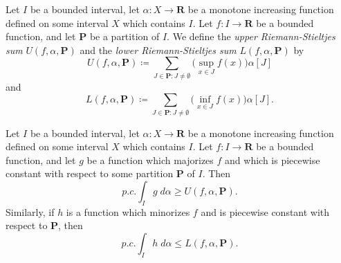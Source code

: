 \begin{additional corollary}\label{ac 11.8.12}
Let \(I\) be a bounded interval, let \(\alpha : X \to \mathbf{R}\) be a monotone increasing function defined on some interval \(X\) which contains \(I\).
Let \(f : I \to \mathbf{R}\) be a bounded function, and let \(\mathbf{P}\) be a partition of \(I\).
We define the \emph{upper Riemann-Stieltjes sum} \(U(f, \alpha, \mathbf{P})\) and the \emph{lower Riemann-Stieltjes sum} \(L(f, \alpha, \mathbf{P})\) by
\[
    U(f, \alpha, \mathbf{P}) \coloneqq \sum_{J \in \mathbf{P} : J \neq \emptyset} \big(\sup_{x \in J} f(x)\big) \alpha[J]
\]
and
\[
    L(f, \alpha, \mathbf{P}) \coloneqq \sum_{J \in \mathbf{P} : J \neq \emptyset} \big(\inf_{x \in J} f(x)\big) \alpha[J].
\]
\end{additional corollary}

\begin{additional corollary}\label{ac 11.8.13}
Let \(I\) be a bounded interval, let \(\alpha : X \to \mathbf{R}\) be a monotone increasing function defined on some interval \(X\) which contains \(I\).
Let \(f : I \to \mathbf{R}\) be a bounded function, and let \(g\) be a function which majorizes \(f\) and which is piecewise constant with respect to some partition \(\mathbf{P}\) of \(I\).
Then
\[
    p.c. \int_I g \; d \alpha \geq U(f, \alpha, \mathbf{P}).
\]
Similarly, if \(h\) is a function which minorizes \(f\) and is piecewise constant with respect to \(\mathbf{P}\), then
\[
    p.c. \int_I h \; d \alpha \leq L(f, \alpha, \mathbf{P}).
\]
\end{additional corollary}

